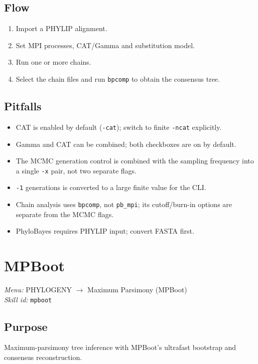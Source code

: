 \documentclass[11pt]{report}
\begin{document}
\subsection{Flow}

\begin{enumerate}
  \item Import a PHYLIP alignment.
  \item Set MPI processes, CAT/Gamma and substitution model.
  \item Run one or more chains.
  \item Select the chain files and run \texttt{bpcomp} to obtain the consensus tree.
\end{enumerate}

\subsection{Pitfalls}

\begin{itemize}
  \item CAT is enabled by default (\texttt{-cat}); switch to finite \texttt{-ncat} explicitly.
  \item Gamma and CAT can be combined; both checkboxes are on by default.
  \item The MCMC generation control is combined with the sampling frequency into a single \texttt{-x} pair, not two separate flags.
  \item \texttt{-1} generations is converted to a large finite value for the CLI.
  \item Chain analysis uses \texttt{bpcomp}, not \texttt{pb\_\allowbreak mpi}; its cutoff/burn-in options are separate from the MCMC flags.
  \item PhyloBayes requires PHYLIP input; convert FASTA first.
\end{itemize}


\section{MPBoot}
\noindent\textit{Menu:} PHYLOGENY $\rightarrow$ Maximum Parsimony (MPBoot)\\
\noindent\textit{Skill id:} \texttt{mpboot}

\subsection{Purpose}

Maximum-parsimony tree inference with MPBoot's ultrafast bootstrap and consensus reconstruction.
\end{document}
